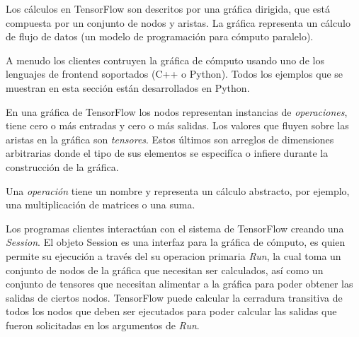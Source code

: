 \begin{remark}
Los cálculos en TensorFlow son descritos por una gráfica dirigida,
que está compuesta por un conjunto de nodos y aristas.
La gráfica representa un cálculo de flujo de datos (un modelo
de programación para cómputo paralelo).
\end{remark}
A menudo los clientes contruyen la gráfica de cómputo usando uno de los
lenguajes de frontend soportados (C++ o Python). Todos los ejemplos
que se muestran en esta sección están desarrollados en Python.

En una gráfica de TensorFlow los nodos representan instancias de \textit{operaciones}, tiene cero o más entradas y
cero o más salidas. Los valores que fluyen sobre las aristas en la gráfica son
\textit{tensores}. Estos últimos son arreglos de dimensiones arbitrarias donde el tipo
de sus elementos se especifíca o infiere durante la construcción de la gráfica.

Una \textit{operación} tiene un nombre y representa un cálculo abstracto, por ejemplo,
una multiplicación de matrices o una suma. 

Los programas clientes interactúan con el sistema de TensorFlow creando una
\textit{Session}. El objeto Session es una interfaz para la gráfica de cómputo,
es quien permite su ejecución a través del su operacion primaria
\textit{Run}, la cual toma un conjunto de nodos de la gráfica que necesitan ser
calculados, así como un conjunto de tensores que necesitan alimentar a la 
gráfica para poder obtener las salidas de ciertos nodos. TensorFlow puede calcular
la cerradura transitiva de todos los nodos que deben ser ejecutados
para poder calcular las salidas que fueron solicitadas en los argumentos de \textit{Run}.

